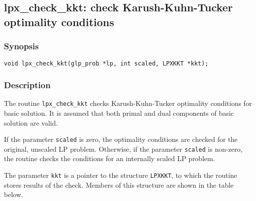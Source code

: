 \subsection{lpx\_check\_kkt: check Karush-Kuhn-Tucker optimality
conditions}

\subsubsection*{Synopsis}

\begin{verbatim}
void lpx_check_kkt(glp_prob *lp, int scaled, LPXKKT *kkt);
\end{verbatim}

\subsubsection*{Description}

The routine \verb|lpx_check_kkt| checks Karush-Kuhn-Tucker optimality
conditions for basic solution. It is assumed that both primal and dual
components of basic solution are valid.

If the parameter \verb|scaled| is zero, the optimality conditions are
checked for the original, unscaled LP problem. Otherwise, if the
parameter \verb|scaled| is non-zero, the routine checks the conditions
for an internally scaled LP problem.

The parameter \verb|kkt| is a pointer to the structure \verb|LPXKKT|,
to which the routine stores results of the check. Members of this
structure are shown in the table below.

